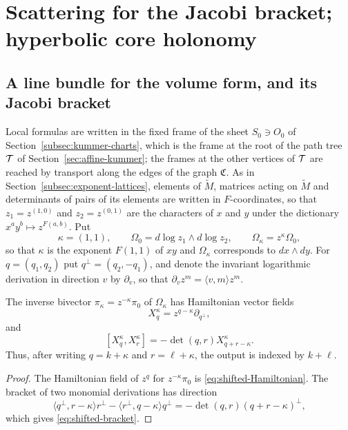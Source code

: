 \section{Scattering for the Jacobi bracket; hyperbolic core holonomy}
\label{sec:jacobi-theta}

\subsection{A line bundle for the volume form, and its Jacobi bracket}
\label{subsec:volume-line}

Local formulas are written in the fixed frame of the sheet $S_0\ni O_0$ of
Section~\ref{subsec:kummer-charts}, which is the frame at the root of the
path tree $\mathcal T$ of Section~\ref{sec:affine-kummer}; the frames at the
other vertices of $\mathcal T$ are reached by transport along the edges of the
graph $\mathfrak C$.  As in Section~\ref{subsec:exponent-lattices},
elements of $\widetilde M$, matrices acting on $\widetilde M$ and
determinants of pairs of its elements are written in $F$-coordinates, so
that $z_1=z^{(1,0)}$ and $z_2=z^{(0,1)}$ are the characters of $x$ and $y$
under the dictionary $x^ay^b\mapsto z^{F(a,b)}$.  Put
\begin{equation}\label{eq:primitive-form}
 \kappa=(1,1),
 \qquad \Omega_0=d\log z_1\wedge d\log z_2,
 \qquad \Omega_\kappa=z^\kappa\Omega_0,
\end{equation}
so that $\kappa$ is the exponent $F(1,1)$ of $xy$ and $\Omega_\kappa$
corresponds to $dx\wedge dy$.  For $q=(q_1,q_2)$ put $q^\perp=(q_2,-q_1)$,
and denote the invariant logarithmic derivation in direction $v$ by
$\partial_v$, so that $\partial_vz^m=\langle v,m\rangle z^m$.

\begin{proposition}
\label{prop:shifted-bracket}
The inverse bivector $\pi_\kappa=z^{-\kappa}\pi_0$ of $\Omega_\kappa$ has
Hamiltonian vector fields
\begin{equation}\label{eq:shifted-Hamiltonian}
 X_q^\kappa=z^{q-\kappa}\partial_{q^\perp},
\end{equation}
and
\begin{equation}\label{eq:shifted-bracket}
 [X_q^\kappa,X_r^\kappa]
 =-\det(q,r)X_{q+r-\kappa}^\kappa.
\end{equation}
Thus, after writing $q=k+\kappa$ and $r=\ell+\kappa$, the output is indexed
by $k+\ell$.
\end{proposition}

\begin{proof}
The Hamiltonian field of $z^q$ for $z^{-\kappa}\pi_0$ is
\eqref{eq:shifted-Hamiltonian}.  The bracket of two monomial derivations has
direction
\[
 \langle q^\perp,r-\kappa\rangle r^\perp
 -\langle r^\perp,q-\kappa\rangle q^\perp
 =-\det(q,r)(q+r-\kappa)^\perp,
\]
which gives \eqref{eq:shifted-bracket}.
\end{proof}

